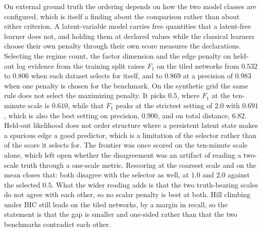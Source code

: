 On external ground truth the ordering depends on how the two model classes are
configured, which is itself a finding about the comparison rather than about
either criterion. A latent-variable model carries free quantities that a
latent-free learner does not, and holding them at declared values while the
classical learners choose their own penalty through their own score measures
the declarations. Selecting the regime count, the factor dimension and the edge
penalty on held-out log evidence from the training split raises $F_1$ on the
tiled networks from $0.532$ to $0.806$ when each dataset selects for itself,
and to $0.869$ at a precision of $0.983$ when one penalty is chosen for the
benchmark. On the synthetic grid the same rule does not select the maximizing
penalty. It picks $0.5$, where $F_1$ at the ten-minute scale is $0.610$, while
that $F_1$ peaks at the strictest setting of $2.0$ with $0.691$, which is also
the best setting on precision, $0.900$, and on total distance, $6.82$. Held-out
likelihood does not order structure where a persistent latent state
makes a spurious edge a good predictor, which is a limitation of the selector
rather than of the score it selects for. The frontier was once scored on the
ten-minute scale alone, which left open whether the disagreement was an artifact
of reading a two-scale truth through a one-scale metric. Rescoring at the
coarsest scale and on the mean closes that: both disagree with the selector as
well, at $1.0$ and $2.0$ against the selected $0.5$. What the wider reading adds
is that the two truth-bearing scales do not agree with each other, so no scalar
penalty is best at both. Hill climbing under BIC still leads on the
tiled networks, by a margin in recall, so the statement is that the gap is
smaller and one-sided rather than that the two benchmarks contradict each other.

